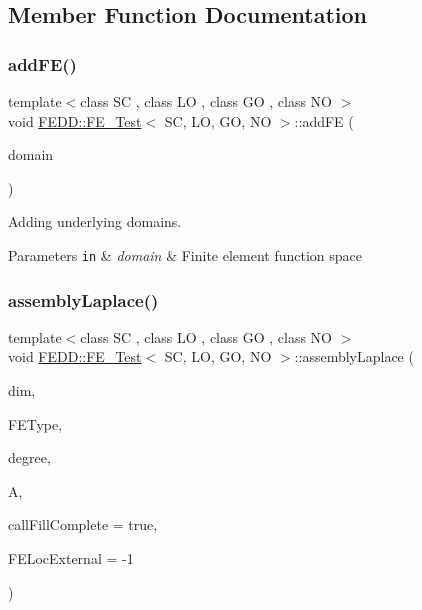 \subsection{Member Function Documentation}
\mbox{\label{classFEDD_1_1FE__Test_a9703f9144722f9c01e5bde489c2e6c2f}} 
\subsubsection{\texorpdfstring{add\+F\+E()}{addFE()}}
{\footnotesize\ttfamily template$<$class SC , class LO , class GO , class NO $>$ \\
void \hyperlink{classFEDD_1_1FE__Test}{F\+E\+D\+D\+::\+F\+E\+\_\+\+Test}$<$ SC, LO, GO, NO $>$\+::add\+FE (\begin{DoxyParamCaption}\item[{Domain\+Const\+Ptr\+\_\+\+Type}]{domain }\end{DoxyParamCaption})}



Adding underlying domains. 


\begin{DoxyParams}[1]{Parameters}
\mbox{\tt in}  & {\em domain} & Finite element function space \\
\hline
\end{DoxyParams}
\mbox{\label{classFEDD_1_1FE__Test_a1680db21378d38bdf239d64961497cb0}} 
\subsubsection{\texorpdfstring{assembly\+Laplace()}{assemblyLaplace()}}
{\footnotesize\ttfamily template$<$class SC , class LO , class GO , class NO $>$ \\
void \hyperlink{classFEDD_1_1FE__Test}{F\+E\+D\+D\+::\+F\+E\+\_\+\+Test}$<$ SC, LO, GO, NO $>$\+::assembly\+Laplace (\begin{DoxyParamCaption}\item[{int}]{dim,  }\item[{string}]{F\+E\+Type,  }\item[{int}]{degree,  }\item[{Matrix\+Ptr\+\_\+\+Type \&}]{A,  }\item[{bool}]{call\+Fill\+Complete = {\ttfamily true},  }\item[{int}]{F\+E\+Loc\+External = {\ttfamily -\/1} }\end{DoxyParamCaption})}



